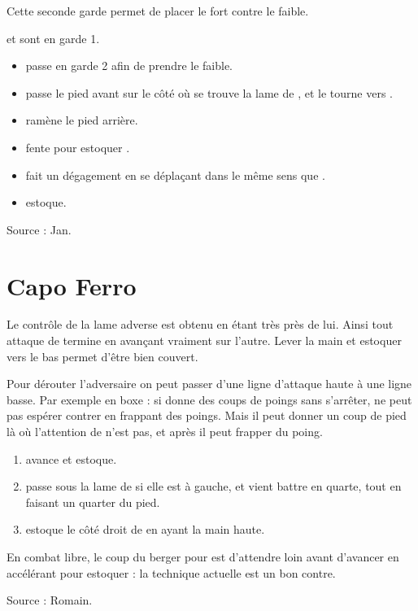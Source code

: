 Cette seconde garde permet de placer le fort contre le faible.


\begin{technique}
\A et \D sont en garde 1.

\begin{itemize}
	\item \A passe en garde 2 afin de prendre le faible.
	\item \A passe le pied avant sur le côté où se trouve la lame de \D, et le tourne vers \D.
	\item \A ramène le pied arrière.
	\item \A fente pour estoquer \D.
	\item \D fait un dégagement en se déplaçant dans le même sens que \A.
	\item \D estoque.
\end{itemize}

Source : Jan.

\end{technique}


\section{Capo Ferro}

Le contrôle de la lame adverse est obtenu en étant très près de lui.
Ainsi tout attaque de termine en avançant vraiment sur l'autre.
Lever la main et estoquer vers le bas permet d'être bien couvert.

Pour dérouter l'adversaire on peut passer d'une ligne d'attaque haute à une ligne basse.
Par exemple en boxe : si \A donne des coups de poings sans s'arrêter, \D ne peut pas espérer contrer en frappant des poings.
Mais il peut donner un coup de pied là où l'attention de \A n'est pas, et après il peut frapper du poing.


\begin{technique}

\begin{enumerate}
	\item \A avance et estoque.
	\item \D passe sous la lame de \D si elle est à gauche, et vient battre en quarte, tout en faisant un quarter du pied.
	\item \D estoque le côté droit de \A en ayant la main haute.
\end{enumerate}

En combat libre, le coup du berger pour \A est d'attendre loin avant d'avancer en accélérant pour estoquer : la technique actuelle est un bon contre.

Source : Romain.

\end{technique}


